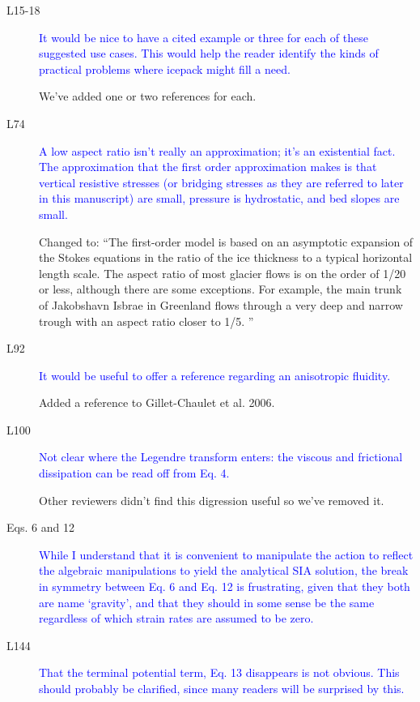 \documentclass{article}
\theoremstyle{definition}
\theoremstyle{plain}
\begin{document}
\begin{description}
\item[L15-18] \textcolor{blue}{It would be nice to have a cited example or three for each of these
suggested use cases. This would help the reader identify the kinds of
practical problems where icepack might fill a need.}

We've added one or two references for each.

\item[L74] \textcolor{blue}{A low aspect ratio isn't really an approximation; it’s an existential fact.
The approximation that the first order approximation makes is that vertical resistive stresses (or bridging stresses as they are referred to later
in this manuscript) are small, pressure is hydrostatic, and bed slopes are
small.}

Changed to: ``The first-order model is based on an asymptotic expansion of the Stokes equations in the ratio of the ice thickness to a typical horizontal length scale.
The aspect ratio of most glacier flows is on the order of 1/20 or less, although there are some exceptions.
For example, the main trunk of Jakobshavn Isbrae in Greenland flows through a very deep and narrow trough with an aspect ratio closer to 1/5.
''

\item[L92] \textcolor{blue}{It would be useful to offer a reference regarding an anisotropic fluidity.}

Added a reference to Gillet-Chaulet et al. 2006.

\item[L100] \textcolor{blue}{Not clear where the Legendre transform enters: the viscous and frictional
dissipation can be read off from Eq. 4.}

Other reviewers didn't find this digression useful so we've removed it.

\item[Eqs. 6 and 12]\textcolor{blue}{While I understand that it is convenient to manipulate the
action to reflect the algebraic manipulations to yield the analytical SIA
solution, the break in symmetry between Eq. 6 and Eq. 12 is frustrating,
given that they both are name `gravity', and that they should in some
sense be the same regardless of which strain rates are assumed to be zero.}

\item[L144] \textcolor{blue}{That the terminal potential term, Eq. 13 disappears is not obvious. This
should probably be clarified, since many readers will be surprised by this.}


\end{description}
\end{document}
